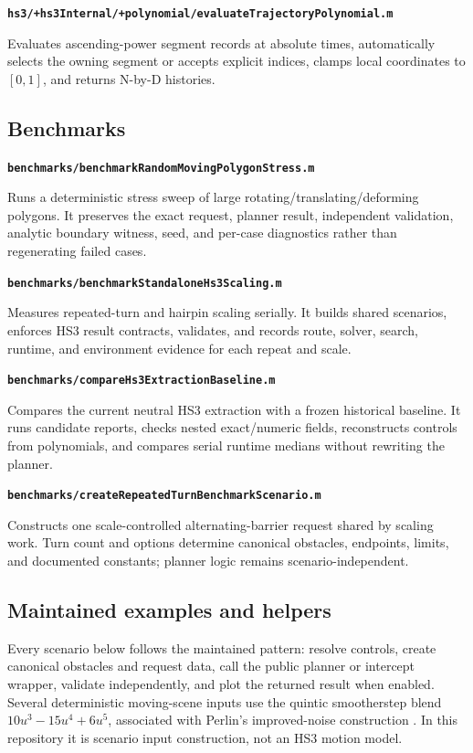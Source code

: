 \documentclass[10pt,letterpaper]{article}
\newcommand{\file}[1]{\nolinkurl{#1}}
\newcommand{\scriptentry}[2]{%
  \par\medskip\noindent\textbf{\file{#1}}\par
  \begingroup\raggedright #2\par\endgroup
}
\begin{document}
\scriptentry{hs3/+hs3Internal/+polynomial/evaluateTrajectoryPolynomial.m}{Evaluates
ascending-power segment records at absolute times, automatically selects the
owning segment or accepts explicit indices, clamps local coordinates to
$[0,1]$, and returns N-by-D histories.}

\subsection{Benchmarks}

\scriptentry{benchmarks/benchmarkRandomMovingPolygonStress.m}{Runs a deterministic
stress sweep of large rotating/translating/deforming polygons. It preserves the
exact request, planner result, independent validation, analytic boundary
witness, seed, and per-case diagnostics rather than regenerating failed cases.}

\scriptentry{benchmarks/benchmarkStandaloneHs3Scaling.m}{Measures repeated-turn
and hairpin scaling serially. It builds shared scenarios, enforces HS3 result
contracts, validates, and records route, solver, search, runtime, and environment
evidence for each repeat and scale.}

\scriptentry{benchmarks/compareHs3ExtractionBaseline.m}{Compares the current
neutral HS3 extraction with a frozen historical baseline. It runs candidate
reports, checks nested exact/numeric fields, reconstructs controls from
polynomials, and compares serial runtime medians without rewriting the planner.}

\scriptentry{benchmarks/createRepeatedTurnBenchmarkScenario.m}{Constructs one
scale-controlled alternating-barrier request shared by scaling work. Turn count
and options determine canonical obstacles, endpoints, limits, and documented
constants; planner logic remains scenario-independent.}

\subsection{Maintained examples and helpers}

Every scenario below follows the maintained pattern: resolve controls, create
canonical obstacles and request data, call the public planner or intercept
wrapper, validate independently, and plot the returned result when enabled.
Several deterministic moving-scene inputs use the quintic smootherstep blend
$10u^3-15u^4+6u^5$, associated with Perlin's improved-noise construction
\cite{perlin2002}. In this repository it is scenario input construction, not an
HS3 motion model.
\end{document}
